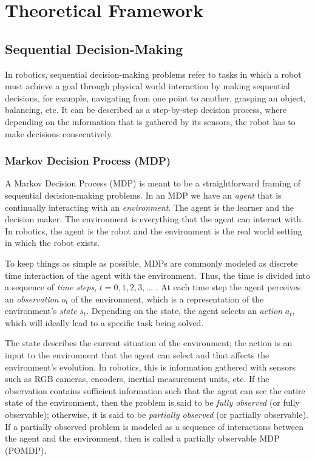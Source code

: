\chapter{Theoretical Framework}
\section{Sequential Decision-Making}
In robotics, sequential decision-making problems refer to tasks in which a robot must achieve a goal through physical world interaction by making sequential decisions, for example, navigating from one point to another, grasping an object, balancing, etc. It can be described as a step-by-step decision process, where depending on the information that is gathered by its sensors, the robot has to make decisions consecutively.

\subsection{Markov Decision Process (MDP) \cite{puterman2014markov, sutton2018reinforcement}}
A Markov Decision Process (MDP) is meant to be a straightforward framing of sequential decision-making problems. In an MDP we have an \emph{agent} that is continually interacting with an \emph{environment}. The agent is the learner and the decision maker. The environment is everything that the agent can interact with. In robotics, the agent is the robot and the environment is the real world setting in which the robot exists.

To keep things as simple as possible, MDPs are commonly modeled as discrete time interaction of the agent with the environment. Thus, the time is divided into a sequence of \emph{time steps}, $t=0,1,2,3,...$ . At each time step the agent perceives an \emph{observation} $o_{t}$ of the environment, which is a representation of the environment's \emph{state} $s_{t}$. Depending on the state, the agent selects an \emph{action} $a_{t}$, which will ideally lead to a specific task being solved. 

The state describes the current situation of the environment; the action is an input to the environment that the agent can select and that affects the environment's evolution. In robotics, this is information gathered with sensors such as RGB cameras, encoders, inertial measurement units, etc. If the observation contains sufficient information such that the agent can see the entire state of the environment, then the problem is said to be \emph{fully observed} (or fully observable); otherwise, it is said to be \emph{partially observed} (or partially observable). If a partially observed problem is modeled as a sequence of interactions between the agent and the environment, then is called a partially observable MDP (POMDP).

